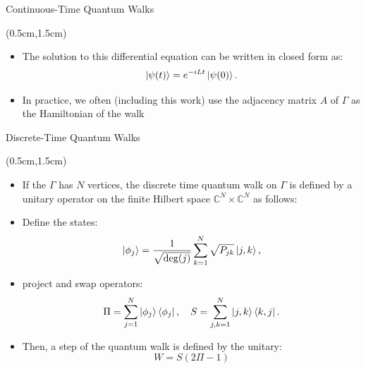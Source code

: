\documentclass{beamer}
\theoremstyle{definition}
\begin{document}
\begin{frame}{Continuous-Time Quantum Walks}
    
    \begin{textblock*}{12cm}(0.5cm,1.5cm)

        \begin{itemize}
            \item The solution to this differential
            equation can be written in closed form as:
            \[
                \ket{\psi(t)} = e^{-iLt} \ket{\psi(0)}.
            \]
            \item In practice, we often (including this work) use the adjacency matrix $A$ of $\Gamma$ as the Hamiltonian of the walk
            
        \end{itemize}
            
    \end{textblock*}
\end{frame}





\begin{frame}{Discrete-Time Quantum Walks}
    \begin{textblock*}{12cm}(0.5cm,1.5cm)
        \begin{itemize}
           
            
            \item If the $\Gamma$ has $N$ vertices, the discrete time quantum walk on $\Gamma$ is defined by a unitary operator on the finite Hilbert space $\mathbb{C}^N \times \mathbb{C}^N$ as follows:
            \item Define the states:
            \[ \ket{\phi_j} = \frac{1}{\sqrt{\deg(j)}} \sum_{k = 1}^N \sqrt{P_{jk}}\ket{j, k}, \]
            \item project and swap operators:
            \[ \Pi = \sum_{j = 1}^N \ket{\phi_j} \bra{\phi_j}, \quad S = \sum_{j, k = 1}^N \ket{j, k} \bra{k, j}. \]
            \item Then, a step of the quantum walk is defined by the unitary:
             \[
             W = S(2\Pi - 1)
             \]

        \end{itemize}
    \end{textblock*}
\end{frame}
\end{document}
